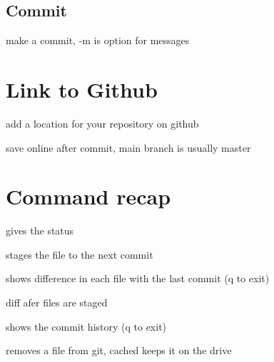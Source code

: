 

	\subsection{Commit}

		 make a commit, -m is option for messages


\section{Link to Github}

	 add a location for your repository on github

	 save online after commit, main branch is usually master


\section{Command recap}

	 gives the status

	 stages the file to the next commit

	 shows difference in each file with the last commit (q to exit)

	 diff afer files are staged

	 shows the commit history (q to exit)

	 removes a file from git, cached keeps it on the drive